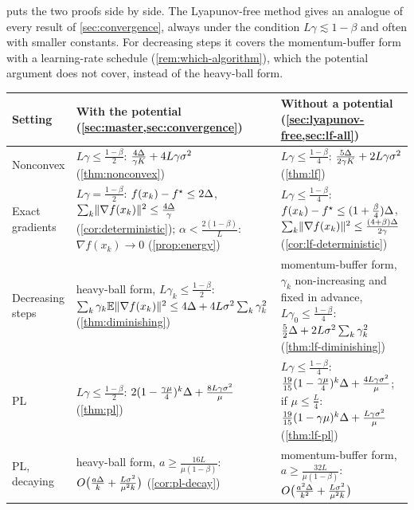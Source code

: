  puts the two proofs side by side. The Lyapunov-free method gives
an analogue of every result of \cref{sec:convergence}, always under the condition
$L\gamma\lesssim1-\beta$ and often with smaller constants. For decreasing steps it covers the
momentum-buffer form with a learning-rate schedule (\cref{rem:which-algorithm}), which the
potential argument does not cover, instead of the heavy-ball form.

\begin{table}[ht]
\centering\small
\renewcommand{\arraystretch}{1.3}
\begin{tabularx}{\textwidth}{@{}>{\raggedright\arraybackslash}p{2.2cm}
  >{\raggedright\arraybackslash}X >{\raggedright\arraybackslash}X@{}}
\toprule
Setting & With the potential (\cref{sec:master,sec:convergence}) & Without a potential (\cref{sec:lyapunov-free,sec:lf-all})\\
\midrule
Nonconvex &
  $L\gamma\le\frac{1-\beta}2$: $\frac{4\Delta}{\gamma K}+4L\gamma\sigma^2$ (\cref{thm:nonconvex}) &
  $L\gamma\le\frac{1-\beta}4$: $\frac{5\Delta}{2\gamma K}+2L\gamma\sigma^2$ (\cref{thm:lf})\\
Exact gradients &
  $L\gamma=\frac{1-\beta}2$: $f(x_k)-f^\star\le2\Delta$, $\sum_k\lVert \nabla f(x_k)\rVert^2\le\frac{4\Delta}{\gamma}$ (\cref{cor:deterministic});
  $\alpha<\frac{2(1-\beta)}L$: $\nabla f(x_k)\to0$ (\cref{prop:energy}) &
  $L\gamma\le\frac{1-\beta}4$: $f(x_k)-f^\star\le(1+\frac\beta4)\Delta$, $\sum_k\lVert \nabla f(x_k)\rVert^2\le\frac{(4+\beta)\Delta}{2\gamma}$
  (\cref{cor:lf-deterministic})\\
Decreasing steps &
  heavy-ball form, $L\gamma_k\le\frac{1-\beta}2$: $\sum_k\gamma_k\mathbb{E}\lVert \nabla f(x_k)\rVert^2\le4\Delta+4L\sigma^2\sum_k\gamma_k^2$
  (\cref{thm:diminishing}) &
  momentum-buffer form, $\gamma_k$ non-increasing and fixed in advance, $L\gamma_0\le\frac{1-\beta}4$:
  $\frac52\Delta+2L\sigma^2\sum_k\gamma_k^2$ (\cref{thm:lf-diminishing})\\
PL &
  $L\gamma\le\frac{1-\beta}2$: $2(1-\frac{\gamma\mu}4)^k\Delta+\frac{8L\gamma\sigma^2}{\mu}$ (\cref{thm:pl}) &
  $L\gamma\le\frac{1-\beta}4$: $\frac{19}{15}(1-\frac{\gamma\mu}4)^k\Delta+\frac{4L\gamma\sigma^2}{\mu}$; if $\mu\le\frac L4$:
  $\frac{19}{15}(1-\gamma\mu)^k\Delta+\frac{L\gamma\sigma^2}{\mu}$ (\cref{thm:lf-pl})\\
PL, decaying &
  heavy-ball form, $a\ge\frac{16L}{\mu(1-\beta)}$: $O\bigl(\frac{a\Delta}{k}+\frac{L\sigma^2}{\mu^2k}\bigr)$ (\cref{cor:pl-decay}) &
  momentum-buffer form, $a\ge\frac{32L}{\mu(1-\beta)}$: $O\bigl(\frac{a^2\Delta}{k^2}+\frac{L\sigma^2}{\mu^2k}\bigr)$

\end{tabularx}
\end{table}
